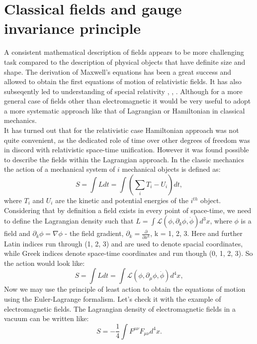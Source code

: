 \section{Classical fields and gauge invariance principle}
\label{sec::gauge}
A consistent mathematical description of fields appears to be more challenging task compared to the description of physical objects that have definite size and shape. The derivation of Maxwell's equations has been a great success and allowed to obtain the first equations of motion of relativistic fields. It has also subseqently led to understanding of special relativity \cite{einstein}, \cite{poincare}, \cite{lorentz}. Although for a more general case of fields other than electromagnetic it would be very useful to adopt a more systematic approach like that of Lagrangian or Hamiltonian in classical mechanics. \\
It has turned out that for the relativistic case Hamiltonian approach was not quite convenient, as the dedicated role of time over other degrees of freedom was in discord with relativistic space-time unification. However it was found possible to describe the fields within the Lagrangian approach. In the classic mechanics the action of a mechanical system of $i$ mechanical objects is defined as:
 \begin{equation}
\nonumber
S = \int Ldt = \int \left( \sum_i T_i - U_i \right) dt,
\end{equation}
where $T_i$ and $U_i$ are the kinetic and potential energies of the $i^{th}$ object. Considering that by definition a field exists in every point of space-time, we need to define the Lagrangian density such that $L = \int \mathcal{L}(\phi,\partial_{k}\phi,\dot\phi ) d^3x$, where $\phi$ is a field and $\partial_{k}\phi = \nabla\phi$ - the field gradient, $\partial_{k} = \frac{\partial}{\partial x^{k}}$,  k = 1, 2, 3. Here and further Latin indices run through (1, 2, 3) and are used to denote spacial coordinates, while Greek indices denote space-time coordinates and run though (0, 1, 2, 3). So the action would look like: 
 \begin{equation}
S = \int Ldt =\int \mathcal{L}(\phi,\partial_{\mu}\phi,\dot\phi ) d^4x,
\end{equation}
Now we may use the principle of least action to obtain the equations of motion using the Euler-Lagrange formalism. Let's check it with the example of electromagnetic fields. The Lagrangian density of electromagnetic fields in a vacuum can be written like:
 \begin{equation}
S = -\frac{1}{4}\int F^{\mu \nu}F_{\mu \nu}d^4x.
\end{equation}
